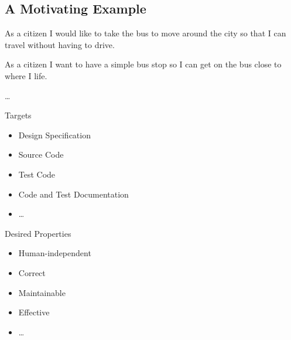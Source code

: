 \subsection{A Motivating Example}

\begin{frame}{\insertsubsection}
	\slideWaterfallModel
\end{frame}

\begin{frame}{\insertsubsection}
	\begin{fancycolumns}[animation=none]
		\begin{tcolorbox}[colback=red!25!white,colframe=red!70!black,title=Bus]
			As a citizen I would like to take the bus to move around the city so that I can travel without having to drive.
		\end{tcolorbox}\pause
		
		\begin{tcolorbox}[colback=red!25!white,colframe=red!70!black,title=Bus Stop]
			As a citizen I want to have a simple bus stop so I can get on the bus close to where I life.
		\end{tcolorbox} \pause
		
		\Huge\dots \pause
		\nextcolumn
		\begin{note}{Targets}
			\begin{itemize}
				\item Design Specification
				\item Source Code
				\item Test Code
				\item Code and Test Documentation
				\item \dots
			\end{itemize}
		\end{note}\pause
		\begin{note}{Desired Properties}
			\begin{itemize}
				\item Human-independent
				\item Correct
				\item Maintainable
				\item Effective
				\item \dots
			\end{itemize}
		\end{note}
	\end{fancycolumns}
\end{frame}

